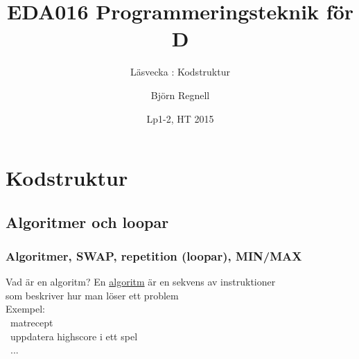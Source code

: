 \documentclass{lecturenotes}
\title[Föreläsningsanteckningar EDA016, 2015]{EDA016 Programmeringsteknik för D}
\subtitle{Läsvecka \vecka: Kodstruktur}
\author{Björn Regnell}
\institute{Datavetenskap, LTH}
\date{Lp1-2, HT 2015}
\renewcommand{\vecka}{2}
\begin{document}
\frame{\titlepage}
\section[Vecka \vecka: Kodstruktur]{Kodstruktur}
\frame{\tableofcontents}

\subsection{Algoritmer och loopar}
\subsubsection{Algoritmer, SWAP, repetition (loopar), MIN/MAX}

\begin{Slide}{Vad är en algoritm?}
En \href{https://sv.wikipedia.org/wiki/Algoritm}{algoritm} är en sekvens av instruktioner\\ som beskriver hur man löser ett problem \\
\vspace{2em}
Exempel: \\ ~matrecept \\ \pause ~uppdatera highscore i ett spel \\ ~...
\end{Slide}
\end{document}
